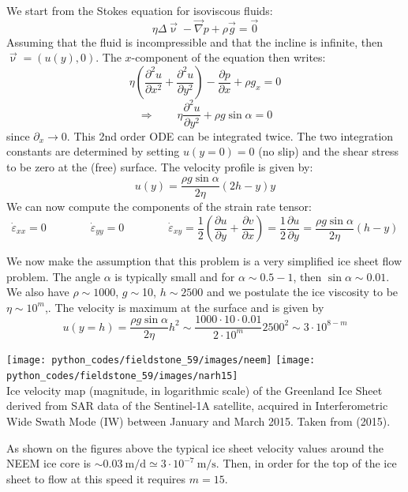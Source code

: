 We start from the Stokes equation for isoviscous fluids:
\[
\eta \Delta \vec{\upnu} - \vec\nabla p + \rho \vec{g} = \vec{0}
\]
Assuming that the fluid is incompressible and that the incline is infinite, 
then $\vec{\upnu}=(u(y),0)$.
The $x$-component of the equation then writes:
\[
\eta\left(\frac{\partial^2 u}{\partial x^2}+\frac{\partial^2 u}{\partial y^2} \right)
- \frac{\partial p}{\partial x} + \rho g_x =0
\]
\[
\Rightarrow \qquad 
\eta\frac{\partial^2 u}{\partial y^2} 
+ \rho g \sin\alpha =0
\]
since $\partial_x\rightarrow 0$.
This 2nd order ODE can be integrated twice. The two integration constants are 
determined by setting $u(y=0)=0$ (no slip) and the shear stress to be zero at the (free)
surface. The velocity profile is given by:
\[
u(y)=\frac{\rho g \sin \alpha}{2 \eta} (2h-y)y
\]
We can now compute the components of the strain rate tensor:
\[
\dot{\varepsilon}_{xx}=0
\qquad
\qquad
\dot{\varepsilon}_{yy}=0
\qquad
\qquad
\dot{\varepsilon}_{xy}
=\frac{1}{2} \left( \frac{\partial u}{\partial y} + \frac{\partial v}{\partial x} \right)
=\frac{1}{2} \frac{\partial u}{\partial y} 
= \frac{\rho g \sin \alpha}{2 \eta} (h-y)
\]

We now make the assumption that this problem is a very simplified ice sheet flow problem.
The angle $\alpha$ is typically small and for $\alpha\sim 0.5-1$\degree, then $\sin\alpha\sim 0.01$. 
We also have $\rho\sim1000$, $g\sim$10,  $h\sim2500$ and we postulate the 
ice viscosity to be $\eta\sim 10^m$,.
The velocity is maximum at the surface and is given by
\begin{equation}
u(y=h)=
\frac{\rho g \sin \alpha}{2 \eta}h^2 
\sim \frac{1000 \cdot 10 \cdot 0.01}{ 2\cdot 10^m}2500^2
\sim 3\cdot 10^{8-m}
\label{eq:ice1}
\end{equation}

\begin{center}
\texttt{[image: python\_codes/fieldstone\_59/images/neem]}
\texttt{[image: python\_codes/fieldstone\_59/images/narh15]}\\
{\captionfont Ice velocity map (magnitude, in logarithmic scale) of the Greenland Ice Sheet
derived from SAR data of the Sentinel-1A satellite, acquired in Interferometric Wide Swath
Mode (IW) between January and March 2015. Taken from \textcite{narh15} (2015).}
\end{center}

As shown on the figures above the typical ice sheet velocity values around the NEEM ice core 
is $\sim 0.03~\si{\meter\per\day} \simeq 3\cdot 10^{-7}~\si{\meter\per\second}$. 
Then, in order for the top of the ice sheet to flow at this speed it requires $m=15$.

